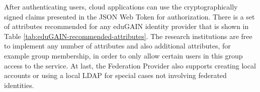 \documentclass{llncs}
\begin{document}
After authenticating users, cloud applications can use the cryptographically signed claims presented in the JSON Web Token for authorization. There is a set of attributes recommended for any eduGAIN identity provider that is shown in Table \ref{tab:eduGAIN-recommended-attributes}. The research institutions are free to implement any number of attributes and also additional attributes, for example group membership, in order to only allow certain users in this group access to the service. At last, the Federation Provider also supports creating local accounts or using a local LDAP for special cases not involving federated identities.

\def\arraystretch{1.5}
\begin{table}[htbp]
	\centering
	\caption{eduGAIN recommended attributes}
	\label{tab:eduGAIN-recommended-attributes}
\end{table}
\end{document}
